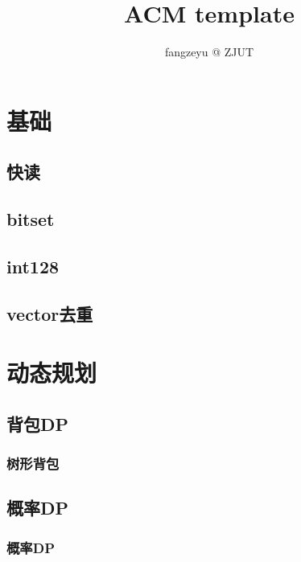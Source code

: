 \documentclass[10pt,a4paper]{article}
\title{ACM template}
\author{fangzeyu @ ZJUT}
\begin{document}
\maketitle
\newpage 

\tableofcontents

\newpage\section{基础}
\subsection{快读}

\subsection{bitset}
\begin{spacing}{1.5}

\end{spacing}

\subsection{int128}

\subsection{vector去重}

\section{动态规划}
\subsection{背包DP}
\subsubsection{树形背包}

\subsection{概率DP}
\subsubsection{概率DP}
\begin{spacing}{1.5}

\end{spacing}

\end{document}
